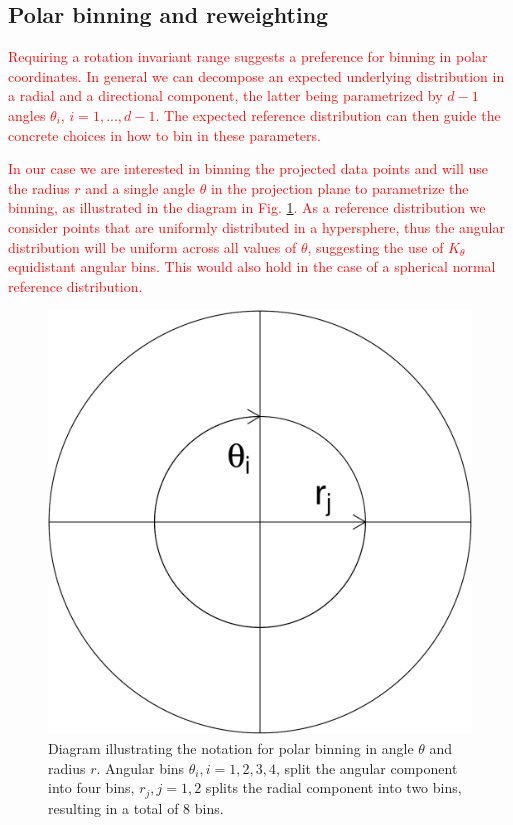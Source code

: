 \documentclass[]{interact}
\theoremstyle{plain}%
\theoremstyle{definition}
\theoremstyle{remark}
\begin{document}
\hypertarget{polar-binning-and-reweighting}{%
\subsection{Polar binning and
reweighting}\label{polar-binning-and-reweighting}}

\textcolor{red}{Requiring a rotation invariant range suggests a preference for binning in polar coordinates. In general we can decompose an expected underlying distribution in a radial and a directional component, the latter being parametrized by $d-1$ angles $\theta_i$, $i=1,...,d-1$. The expected reference distribution can then guide the concrete choices in how to bin in these parameters.}

\textcolor{red}{In our case we are interested in binning the projected data points and will use the radius $r$ and a single angle $\theta$ in the projection plane to parametrize the binning, as illustrated in the diagram in Fig. \ref{fig:sketch}. As a reference distribution we consider points that are uniformly distributed in a hypersphere, thus the angular distribution will be uniform across all values of $\theta$, suggesting the use of $K_{\theta}$ equidistant angular bins. This would also hold in the case of a spherical normal reference distribution.}

\begin{figure}

{\centering \includegraphics[width=0.3\linewidth]{section_pursuit_files/figure-latex/sketch-1} 

}

\caption{Diagram illustrating the notation for polar binning in angle $\theta$ and radius $r$. Angular bins $\theta_i, i=1, 2, 3, 4$, split the angular component into four bins, $r_j, j=1, 2$ splits the radial component into two bins, resulting in a total of 8 bins.}\label{fig:sketch}
\end{figure}
\end{document}
